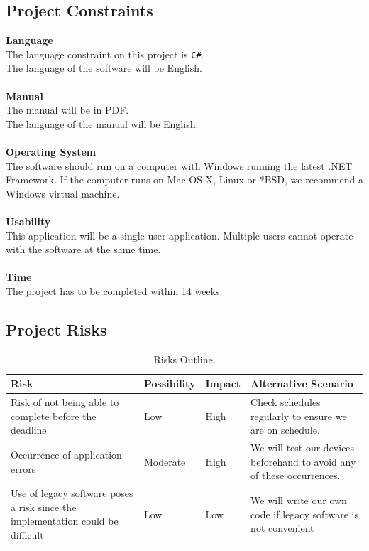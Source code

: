 \documentclass[a4paper,11pt]{article}
\begin{document}
    \subsection{Project Constraints}
    \textbf{Language}\\The language constraint on this project is \texttt{C\#}.
    \\ The language of the software will be English.
    \\
    \\
     \textbf{Manual}\\The manual will be in PDF.
     \\ The language of the manual will be English.
     \\
     \\
    \textbf{Operating System}\\ The software should run on a computer with Windows running the latest .NET Framework. If the computer runs on Mac OS X, Linux or *BSD, we recommend a Windows virtual machine.
    \\
    \\
    \textbf{Usability}
    \\This application will be a single user application. Multiple users cannot operate with the software at the same time.
    \\ 
    \\
    
    \textbf{Time}
    \\The project has to be completed within 14 weeks.
    
    \subsection{Project Risks}
    \begin{table}[h!]
    \centering
    \caption{Risks Outline.}
    \label{tab:table1}
    \begin{tabularx}{\textwidth}{ |X|X|X|X| }
    \hline
    \textbf{Risk} & \textbf{
   Possibility
	}& \textbf{
Impact
}& \textbf{
Alternative Scenario
}
    \\
    \hline
    Risk of not being able to complete before the deadline	&Low &High&
    Check schedules regularly to ensure we are on schedule.
    \\
    \hline
    Occurrence of application errors & Moderate&High&
    We will test our devices beforehand to avoid any of these occurrences.
    \\
    \hline
    
    Use of legacy software poses a risk since the implementation could be difficult & Low&Low&
    We will write our own code if legacy software is not convenient  
    \\ \hline
    
  
    
    \end{tabularx}
    \end{table}
   \newpage
\end{document}
